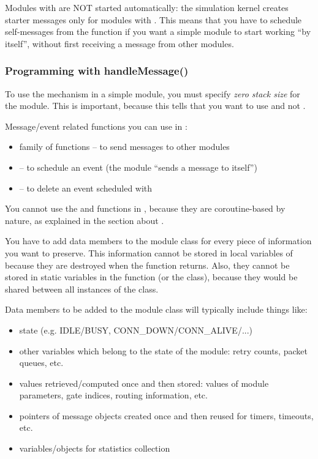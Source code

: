 Modules with  are NOT started automatically:
the simulation kernel creates starter messages
only for modules with . This means that you have to
schedule self-messages from the
 function if you want a 
simple module to start working ``by itself'', without first receiving
a message from other modules.


\subsubsection{Programming with handleMessage()}


To use the  mechanism in a
simple module, you must specify \textit{zero
  stack size} for the module. This is
important, because this tells {\opp} that you want to use
 and not .

Message/event related functions you can use in :

\begin{itemize}
  \item{ family of functions -- to send messages to other modules}
  \item{ -- to schedule an event (the module ``sends a message to itself'')}
  \item{ -- to delete an event scheduled with }
\end{itemize}

You cannot use the  and
 functions in , because they are
coroutine-based by nature, as explained in the section about
.

You have to add data members to the module class for every piece
of information you want to preserve. This information cannot
be stored in local variables of  because they
are destroyed when the function returns. Also, they cannot be
stored in static variables in the function (or the class), because
they would be shared between all instances of the class.


Data members to be added to the module class will typically include
things like:

\begin{itemize}
  \item{state (e.g. IDLE/BUSY, CONN\_DOWN/CONN\_ALIVE/...)}
  \item{other variables which belong to the state of the module: retry
    counts, packet queues, etc.}
  \item{values retrieved/computed once and then stored: values of module
    parameters, gate indices, routing information, etc.}
  \item{pointers of message objects created once and then reused for
    timers, timeouts, etc.}
  \item{variables/objects for statistics collection}
\end{itemize}

